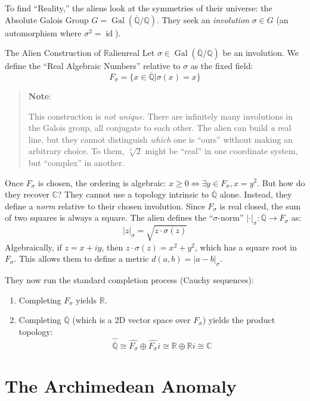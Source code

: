 \documentclass{article}
\newcommand{\C}{{\mathbb{C}}}
\newcommand{\Q}{{\mathbb{Q}}}
\newcommand{\R}{{\mathbb{R}}}
\newcommand{\id}{{\operatorname{id}}}
\newcommand{\Gal}{{\operatorname{Gal}}}
\renewcommand{\mid}{\big|}
\newcommand{\oln}[1]{{\overline{#1}}}
\newenvironment{note}
 {\begin{tcolorbox}[enhanced, sharp corners, colback=white , borderline={0.2pt}{0pt}{black}]
   \begin{quote}\textbf{Note}:
   }{
   \end{quote}\end{tcolorbox}}
\begin{document}
To find ``Reality,'' the aliens look at the symmetries of their universe: the Absolute Galois Group $G = \Gal(\oln{\Q}/\Q)$. They seek an \emph{involution} $\sigma \in G$ (an automorphism where $\sigma^2 = \id$).

\begin{defn}{The Alien Construction of $\R$}{alienreal}
    Let $\sigma \in \Gal(\oln{\Q}/\Q)$ be an involution. We define the ``Real Algebraic Numbers'' relative to $\sigma$ as the fixed field:
    \[ F_\sigma = \{ x \in \oln{\Q} \mid \sigma(x) = x \} \]
\end{defn}

\begin{note}
    This construction is \emph{not unique}. There are infinitely many involutions in the Galois group, all conjugate to each other. The alien can build \emph{a} real line, but they cannot distinguish \emph{which} one is ``ours'' without making an arbitrary choice. To them, $\sqrt[3]{2}$ might be ``real'' in one coordinate system, but ``complex'' in another.
\end{note}

Once $F_\sigma$ is chosen, the ordering is algebraic: $x \ge 0 \iff \exists y \in F_\sigma, x=y^2$. But how do
they recover $\C$? They cannot use a topology intrinsic to $\oln{\Q}$ alone. Instead, they define a
\emph{norm} relative to their chosen involution. Since $F_\sigma$ is real closed, the sum of two squares is
always a square. The alien defines the ``$\sigma$-norm'' $|\cdot|_\sigma : \oln{\Q} \to F_\sigma$ as:
\[ |z|_\sigma = \sqrt{z \cdot \sigma(z)} \]
Algebraically, if $z = x + iy$, then $z \cdot \sigma(z) = x^2 + y^2$, which has a square root in $F_\sigma$. This allows them to define a metric $d(a, b) = |a - b|_\sigma$.

They now run the standard completion process (Cauchy sequences):
\begin{enumerate}
    \item Completing $F_\sigma$ yields $\R$.
    \item Completing $\oln{\Q}$ (which is a 2D vector space over $F_\sigma$) yields the product topology:
    \[ \widehat{\oln{\Q}} \cong \widehat{F_\sigma} \oplus \widehat{F_\sigma} i \cong \R \oplus \R i \cong \C \]
\end{enumerate}

\section{The Archimedean Anomaly}
\end{document}

